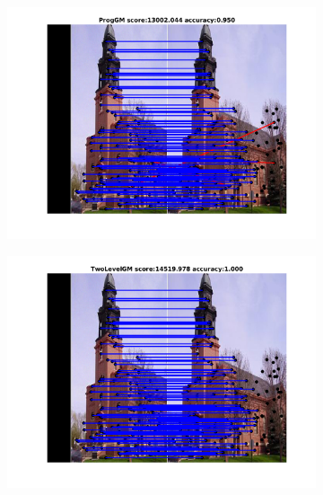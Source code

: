 \begin{figure}[h]
	\begin{subfigure}[b]{0.33\textwidth}
		\centering
		\includegraphics[scale=0.25]{"chapter3/fig/ImageTrafo/anchor_descr/using_cpd_afftrafo/fi_3_ProgGM"} 
	\end{subfigure}%
	\begin{subfigure}[b]{0.33\textwidth}
		\centering
		\includegraphics[scale=0.25]{"chapter3/fig/ImageTrafo/anchor_descr/using_cpd_afftrafo/fi_3_TwoLevelGM"} 
	\end{subfigure} 
	\begin{subfigure}[b]{0.33\textwidth}
		\centering

\end{subfigure}
\end{figure}
